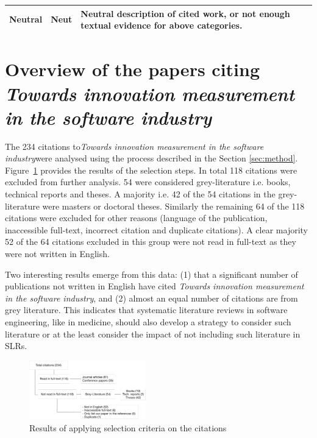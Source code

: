 \documentclass[sigplan]{acmart}
\newcommand{\theArticle}{\textit{Towards innovation measurement in the software industry}}
\begin{document}
\begin{table}
\begin{tabular}{llp{12cm}}
		\midrule
		Neutral             & Neut         & Neutral description of cited work, or not enough textual evidence for above categories.\\
		\bottomrule
	\end{tabular}
\end{table}

\section{Overview of the papers citing \theArticle}\label{sec:whocites}  %

The 234 citations to\theArticle were analysed using the process described in the Section \ref{sec:method}. Figure~\ref{fig:selection} provides the results of the selection steps. In total 118 citations were excluded from further analysis. 54 were considered grey-literature i.e. books, technical reports and theses. A majority i.e. 42 of the 54 citations in the grey-literature were masters or doctoral theses. Similarly the remaining 64 of the 118 citations were excluded for other reasons (language of the publication, inaccessible full-text, incorrect citation and duplicate citations). A clear majority 52 of the 64 citations excluded in this group were not read in full-text as they were not written in English.

Two interesting results emerge from this data: (1) that a significant number of publications not written in English have cited \theArticle, and (2) almost an equal number of citations are from grey literature. This indicates that systematic literature reviews in software engineering, like in medicine, should also develop a strategy to consider such literature or at the least consider the impact of not including such literature in SLRs.

\begin{figure}[htbp]
	\begin{center}
		\includegraphics[width=0.45\textwidth,height=\textheight,keepaspectratio]{Figures/Citations.pdf}
	\end{center}
	\caption{Results of applying selection criteria on the citations}
	\label{fig:selection}
\end{figure}
\end{document}
